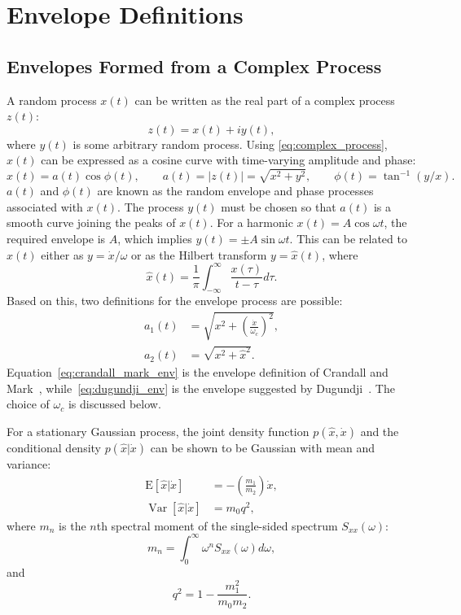 \documentclass[12pt]{article}
\theoremstyle{plain}
\theoremstyle{definition}
\theoremstyle{remark}
\theoremstyle{plain}
\theoremstyle{definition}
\begin{document}
\section{Envelope Definitions}
\subsection{Envelopes Formed from a Complex Process}
A random process $x(t)$ can be written as the real part of a complex process $z(t)$:
\begin{equation}
    z(t) = x(t) + i y(t),
    \label{eq:complex_process}
\end{equation}
where $y(t)$ is some arbitrary random process. Using \eqref{eq:complex_process}, $x(t)$ can be expressed as a cosine curve with time-varying amplitude and phase:
\begin{equation}
    x(t) = a(t) \cos \phi(t), \qquad a(t) = |z(t)| = \sqrt{x^2 + y^2}, \qquad \phi(t) = \tan^{-1}(y/x).
    \label{eq:envelope_phase}
\end{equation}
$a(t)$ and $\phi(t)$ are known as the random envelope and phase processes associated with $x(t)$. The process $y(t)$ must be chosen so that $a(t)$ is a smooth curve joining the peaks of $x(t)$. For a harmonic $x(t) = A \cos \omega t$, the required envelope is $A$, which implies $y(t) = \pm A \sin \omega t$. This can be related to $x(t)$ either as $y = \dot{x}/\omega$ or as the Hilbert transform $y = \hat{x}(t)$, where
\begin{equation}
    \hat{x}(t) = \frac{1}{\pi} \int_{-\infty}^{\infty} \frac{x(\tau)}{t - \tau} d\tau.
    \label{eq:hilbert}
\end{equation}
Based on this, two definitions for the envelope process are possible:
\begin{align}
    a_1(t) &= \sqrt{x^2 + \left(\frac{\dot{x}}{\omega_c}\right)^2}, \label{eq:crandall_mark_env} \\
    a_2(t) &= \sqrt{x^2 + \hat{x}^2}. \label{eq:dugundji_env}
\end{align}
Equation~\eqref{eq:crandall_mark_env} is the envelope definition of Crandall and Mark~\cite{crandall1963}, while~\eqref{eq:dugundji_env} is the envelope suggested by Dugundji~\cite{dugundji1958}. The choice of $\omega_c$ is discussed below.

For a stationary Gaussian process, the joint density function $p(\hat{x}, \dot{x})$ and the conditional density $p(\hat{x}|\dot{x})$ can be shown to be Gaussian with mean and variance:
\begin{align}
    \mathrm{E}[\hat{x}|\dot{x}] &= -\left(\frac{m_1}{m_2}\right) \dot{x}, \\
    \operatorname{Var}[\hat{x}|\dot{x}] &= m_0 q^2,
\end{align}
where $m_n$ is the $n$th spectral moment of the single-sided spectrum $S_{xx}(\omega)$:
\begin{equation}
    m_n = \int_0^\infty \omega^n S_{xx}(\omega) d\omega,
\end{equation}
and
\begin{equation}
    q^2 = 1 - \frac{m_1^2}{m_0 m_2}.
    \label{eq:q}
\end{equation}
\end{document}
